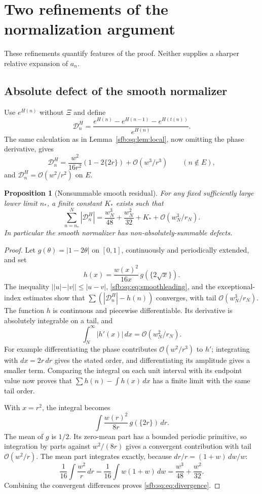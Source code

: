 \documentclass[11pt]{article}
\newtheorem{proposition}[theorem]{Proposition}
\theoremstyle{remark}\newtheorem{remark}[theorem]{Remark}
\newcommand{\OO}{\mathcal O}
\begin{document}
\section{Two refinements of the normalization argument}\label{sfb:sq:sec:refinements}
These refinements quantify features of the proof. Neither supplies a sharper relative expansion of $a_n$.

\subsection{Absolute defect of the smooth normalizer}
Use $e^{H(n)}$ without $\Xi$ and define
\begin{equation}\label{sfb:sq:eq:smoothdefect}
 \mathcal D^H_n=
 \frac{e^{H(n)}-e^{H(n-1)}-e^{H(t(n))}}{e^{H(n)}}.
\end{equation}
The same calculation as in Lemma~\ref{sfb:sq:lem:local}, now omitting the phase derivative, gives
\begin{equation}\label{sfb:sq:eq:smoothleading}
 \mathcal D^H_n=\frac{w^2}{16r^2}(1-2\{2r\})
                  +\OO(w^3/r^3)\qquad(n\notin E),
\end{equation}
and $\mathcal D^H_n=\OO(w^2/r^2)$ on $E$.

\begin{proposition}[Nonsummable smooth residual]\label{sfb:sq:prop:nonsum}
For any fixed sufficiently large lower limit $n_*$, a finite constant $K_*$ exists such that
\begin{equation}\label{sfb:sq:eq:divergence}
 \sum_{n=n_*}^{N}|\mathcal D^H_n|
 =\frac{w_N^3}{48}+\frac{w_N^2}{32}+K_*
     +\OO(w_N^3/r_N).
\end{equation}
In particular the smooth normalizer has non-absolutely-summable defects.
\end{proposition}
\begin{proof}
Let $g(\theta)=|1-2\theta|$ on $[0,1]$, continuously and periodically extended, and set
\[
 h(x)=\frac{w(x)^2}{16x}\,g(\{2\sqrt x\}).
\]
The inequality $||u|-|v||\le|u-v|$, \eqref{sfb:sq:eq:smoothleading}, and the exceptional-index estimates show that
$\sum(|\mathcal D^H_n|-h(n))$ converges, with tail $\OO(w_N^3/r_N)$. The function $h$ is continuous and piecewise differentiable. Its derivative is absolutely integrable on a tail, and
\[
 \int_N^\infty|h'(x)|\,dx=\OO(w_N^2/r_N).
\]
For example differentiating the phase contributes $\OO(w^2/r^3)$ to $h'$; integrating with $dx=2r\,dr$ gives the stated order, and differentiating its amplitude gives a smaller term. Comparing the integral on each unit interval with its endpoint value now proves that $\sum h(n)-\int h(x)\,dx$ has a finite limit with the same tail order.

With $x=r^2$, the integral becomes
\[
 \int\frac{w(r)^2}{8r}\,g(\{2r\})\,dr.
\]
The mean of $g$ is $1/2$. Its zero-mean part has a bounded periodic primitive, so integration by parts against $w^2/(8r)$ gives a convergent contribution with tail $\OO(w^2/r)$. The mean part integrates exactly, because $dr/r=(1+w)\,dw/w$:
\[
 \frac1{16}\int\frac{w^2}{r}\,dr
 =\frac1{16}\int w(1+w)\,dw
 =\frac{w^3}{48}+\frac{w^2}{32}.
\]
Combining the convergent differences proves \eqref{sfb:sq:eq:divergence}.
\end{proof}
\end{document}

